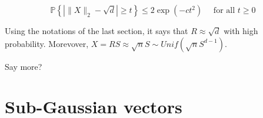 \documentclass{article}
\begin{document}
\begin{equation}
  \mathbb{P}\left\{\left|\|X\|_{2}-\sqrt{d}\right| \geq t\right\} \leq 2 \exp \left(-c t^{2}\right) \quad \text { for all } t \geq 0
\end{equation}

Using the notations of the last section, it says that $R \approx \sqrt{d}$ with
high probability. Morevover, $X = RS \approx \sqrt{n}S \sim
Unif(\sqrt{n}S^{d-1})$.

Say more?

\section{Sub-Gaussian vectors}
\end{document}
